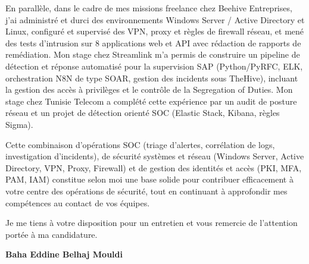 \documentclass[a4paper,11pt]{article}
\begin{document}
En parallèle, dans le cadre de mes missions freelance chez Beehive Entreprises, j'ai administré et durci des environnements Windows Server / Active Directory et Linux, configuré et supervisé des VPN, proxy et règles de firewall réseau, et mené des tests d'intrusion sur 8 applications web et API avec rédaction de rapports de remédiation. Mon stage chez Streamlink m'a permis de construire un pipeline de détection et réponse automatisé pour la supervision SAP (Python/PyRFC, ELK, orchestration N8N de type SOAR, gestion des incidents sous TheHive), incluant la gestion des accès à privilèges et le contrôle de la Segregation of Duties. Mon stage chez Tunisie Telecom a complété cette expérience par un audit de posture réseau et un projet de détection orienté SOC (Elastic Stack, Kibana, règles Sigma).

Cette combinaison d'opérations SOC (triage d'alertes, corrélation de logs, investigation d'incidents), de sécurité systèmes et réseau (Windows Server, Active Directory, VPN, Proxy, Firewall) et de gestion des identités et accès (PKI, MFA, PAM, IAM) constitue selon moi une base solide pour contribuer efficacement à votre centre des opérations de sécurité, tout en continuant à approfondir mes compétences au contact de vos équipes.

Je me tiens à votre disposition pour un entretien et vous remercie de l'attention portée à ma candidature.

\vspace{0.8cm}

\begin{flushright}
{\bfseries Baha Eddine Belhaj Mouldi}
\end{flushright}
\end{document}
